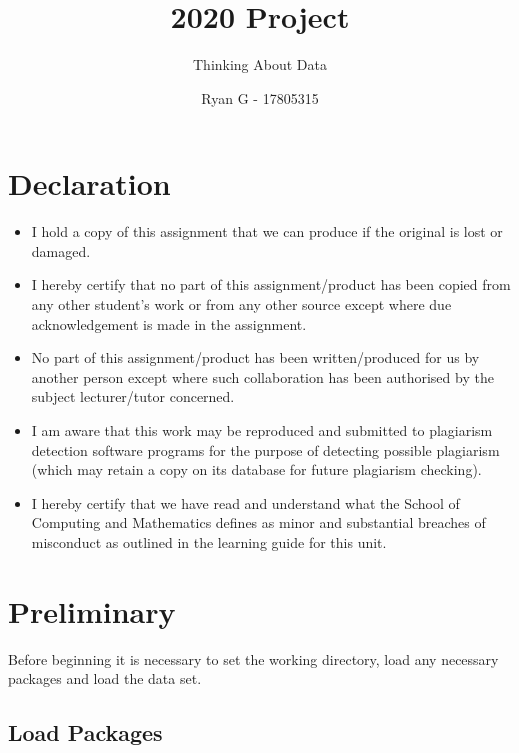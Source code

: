 \documentclass{article}
\title{2020 Project}
\subtitle{Thinking About Data}
\author{Ryan G - 17805315}
\date{}
\providecommand{\tightlist}{%
  \setlength{\itemsep}{0pt}\setlength{\parskip}{0pt}}
\begin{document}
\maketitle

{
\setcounter{tocdepth}{3}
\tableofcontents
}
\hypertarget{declaration}{%
\section{Declaration}\label{declaration}}

\begin{itemize}
\tightlist
\item
  I hold a copy of this assignment that we can produce if the original
  is lost or damaged.
\item
  I hereby certify that no part of this assignment/product has been
  copied from any other student's work or from any other source except
  where due acknowledgement is made in the assignment.
\item
  No part of this assignment/product has been written/produced for us by
  another person except where such collaboration has been authorised by
  the subject lecturer/tutor concerned.
\item
  I am aware that this work may be reproduced and submitted to
  plagiarism detection software programs for the purpose of detecting
  possible plagiarism (which may retain a copy on its database for
  future plagiarism checking).
\item
  I hereby certify that we have read and understand what the School of
  Computing and Mathematics defines as minor and substantial breaches of
  misconduct as outlined in the learning guide for this unit.
\end{itemize}

\hypertarget{preliminary}{%
\section{Preliminary}\label{preliminary}}

Before beginning it is necessary to set the working directory, load any
necessary packages and load the data set.

\hypertarget{load-packages}{%
\subsection{Load Packages}\label{load-packages}}
\end{document}
